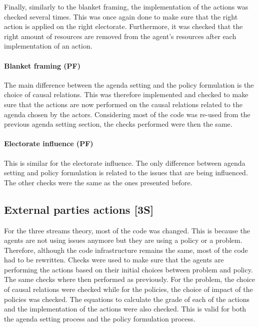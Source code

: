 Finally, similarly to the blanket framing, the implementation of the actions was checked several times. This was once again done to make sure that the right action is applied on the right electorate. Furthermore, it was checked that the right amount of resources are removed from the agent’s resources after each implementation of an action.

%
\paragraph{Blanket framing (PF)}

The main difference between the agenda setting and the policy formulation is the choice of causal relations. This was therefore implemented and checked to make sure that the actions are now performed on the causal relations related to the agenda chosen by the actors. Considering most of the code was re-used from the previous agenda setting section, the checks performed were then the same.

%
\paragraph{Electorate influence (PF)}

This is similar for the electorate influence. The only difference between agenda setting and policy formulation is related to the issues that are being influenced. The other checks were the same as the ones presented before.

\subsection{External parties actions [3S]}

For the three streams theory, most of the code was changed. This is because the agents are not using issues anymore but they are using a policy or a problem. Therefore, although the code infrastructure remains the same, most of the code had to be rewritten. Checks were used to make sure that the agents are performing the actions based on their initial choices between problem and policy. The same checks where then performed as previously. For the problem, the choice of causal relations were checked while for the policies, the choice of impact of the policies was checked. The equations to calculate the grade of each of the actions and the implementation of the actions were also checked. This is valid for both the agenda setting process and the policy formulation process.


